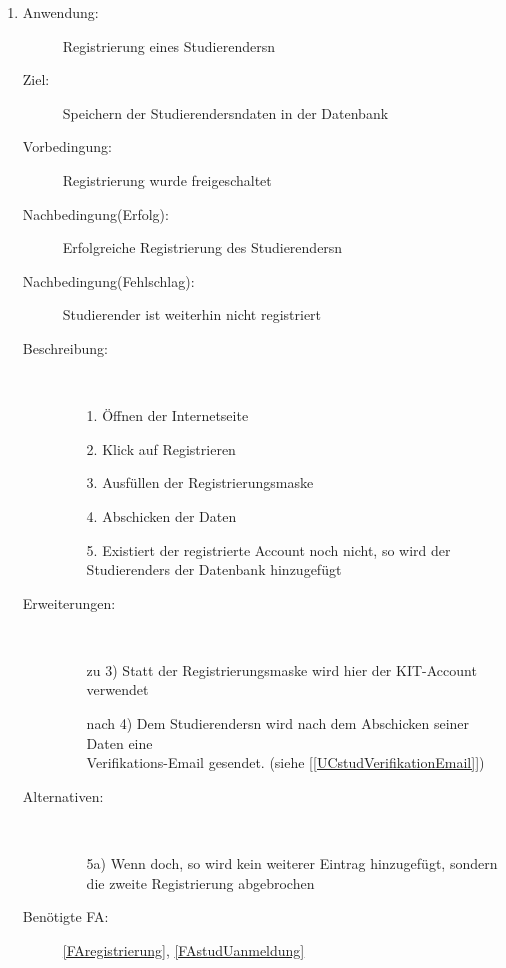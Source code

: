 \documentclass[parskip=full]{scrartcl}
\newcommand{\swtLabel}[1]{\textbf{/#1\arabic*0/}}
\newcommand{\testRef}[1]{[\ref{#1}]}
\begin{document}
\begin{enumerate}[label=\swtLabel{S}]
	\item \label{UCstudReg}
    \begin{description}
  	\item[Anwendung:] Registrierung eines \glspl{Studierender}n
  	\item[Ziel:] Speichern der \glspl{Studierender}ndaten in der Datenbank
  	\item[Vorbedingung:] Registrierung wurde freigeschaltet
  	\item[Nachbedingung(Erfolg):] Erfolgreiche Registrierung des \glspl{Studierender}n
  	\item[Nachbedingung(Fehlschlag):] \gls{Studierender} ist weiterhin nicht
  	registriert
  	\item[Beschreibung:]~
  	\begin{enumerate}
  	  \item[1.] Öffnen der Internetseite
      \item[2.] Klick auf Registrieren
      \item[3.] Ausfüllen der Registrierungsmaske %
      \item[4.] Abschicken der Daten
      \item[5.] Existiert der registrierte Account noch nicht, so wird der
      \glspl{Studierender} der Datenbank hinzugefügt
  	\end{enumerate}
  	\item[Erweiterungen:]~
  	\begin{enumerate}
  	  \item[zu 3)] Statt der Registrierungsmaske wird hier der \gls{KIT-Account}
  	  verwendet
  	  \item[nach 4)] Dem \glspl{Studierender}n wird nach dem Abschicken seiner Daten eine
  	  \\
  	  Verifikations-Email gesendet. (siehe \testRef{UCstudVerifikationEmail})
  	 \end{enumerate} 
  	\item[Alternativen:]~
  	\begin{enumerate}
  	  \item[5a)] Wenn doch, so wird kein weiterer Eintrag hinzugefügt, sondern
  	  die zweite Registrierung abgebrochen
  	\end{enumerate} 
  	\item[Benötigte FA:] \ref{FAregistrierung}, \ref{FAstudUanmeldung}
  \end{description}
%   
  

\end{enumerate}
\end{document}

